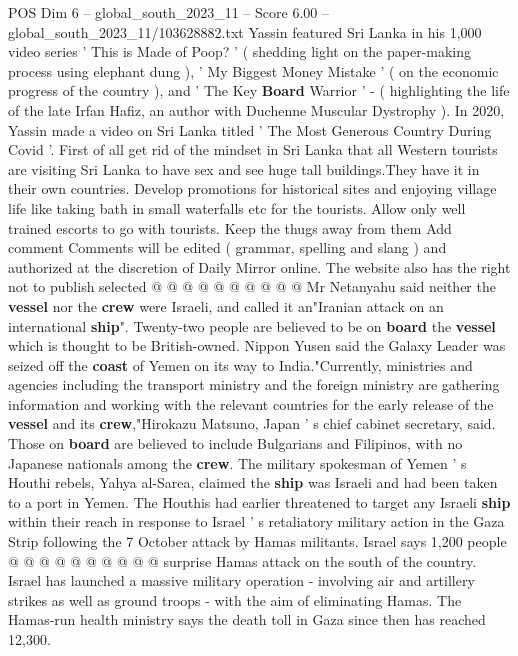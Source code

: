 \begin{textsample}{POS Dim 6 – global\_south\_2023\_11 – Score 6.00 – global\_south\_2023\_11/103628882.txt}  \label{ex:f6_pos_305}
Yassin featured Sri Lanka in his 1,000 video series ' This is Made of Poop? ' ( shedding light on the paper-making process using elephant dung ), ' My Biggest Money Mistake ' ( on the economic progress of the country ), and ' The Key \textbf{Board} Warrior ' - ( highlighting the life of the late Irfan Hafiz, an author with Duchenne Muscular Dystrophy ).
In 2020, Yassin made a video on Sri Lanka titled ' The Most Generous Country During Covid '.
First of all get rid of the mindset in Sri Lanka that all Western tourists are visiting Sri Lanka to have sex and see huge tall buildings.They have it in their own countries.
Develop promotions for historical sites and enjoying village life like taking bath in small waterfalls etc for the tourists.
Allow only well trained escorts to go with tourists.
Keep the thugs away from them Add comment Comments will be edited ( grammar, spelling and slang ) and authorized at the discretion of Daily Mirror online.
The website also has the right not to publish selected @ @ @ @ @ @ @ @ @ @ Mr Netanyahu said neither the \textbf{vessel} nor the \textbf{crew} were Israeli, and called it an"Iranian attack on an international \textbf{ship}".
Twenty-two people are believed to be on \textbf{board} the \textbf{vessel} which is thought to be British-owned.
Nippon Yusen said the Galaxy Leader was seized off the \textbf{coast} of Yemen on its way to India."Currently, ministries and agencies including the transport ministry and the foreign ministry are gathering information and working with the relevant countries for the early release of the \textbf{vessel} and its \textbf{crew},"Hirokazu Matsuno, Japan ' s chief cabinet secretary, said.
Those on \textbf{board} are believed to include Bulgarians and Filipinos, with no Japanese nationals among the \textbf{crew}.
The military spokesman of Yemen ' s Houthi rebels, Yahya al-Sarea, claimed the \textbf{ship} was Israeli and had been taken to a port in Yemen.
The Houthis had earlier threatened to target any Israeli \textbf{ship} within their reach in response to Israel ' s retaliatory military action in the Gaza Strip following the 7 October attack by Hamas militants.
Israel says 1,200 people @ @ @ @ @ @ @ @ @ @ surprise Hamas attack on the south of the country.
Israel has launched a massive military operation - involving air and artillery strikes as well as ground troops - with the aim of eliminating Hamas.
The Hamas-run health ministry says the death toll in Gaza since then has reached 12,300.

\end{textsample}
